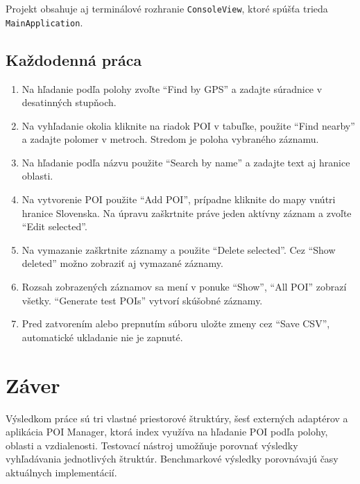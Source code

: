 \documentclass[12pt,a4paper,oneside]{report}
\begin{document}
Projekt obsahuje aj terminálové rozhranie \texttt{Console\allowbreak View},
ktoré spúšťa trieda \texttt{Main\allowbreak Application}.

\section{Každodenná práca}
\begin{enumerate}[leftmargin=1.5em]
\item Na hľadanie podľa polohy zvoľte \enquote{Find by GPS} a zadajte súradnice v desatinných stupňoch.
\item Na vyhľadanie okolia kliknite na riadok POI v tabuľke, použite \enquote{Find nearby} a zadajte polomer v metroch. Stredom je poloha vybraného záznamu.
\item Na hľadanie podľa názvu použite \enquote{Search by name} a zadajte text aj hranice oblasti.
\item Na vytvorenie POI použite \enquote{Add POI}, prípadne kliknite do mapy vnútri hranice Slovenska. Na úpravu zaškrtnite práve jeden aktívny záznam a zvoľte \enquote{Edit selected}.
\item Na vymazanie zaškrtnite záznamy a použite \enquote{Delete selected}. Cez \enquote{Show deleted} možno zobraziť aj vymazané záznamy.
\item Rozsah zobrazených záznamov sa mení v ponuke \enquote{Show}, \enquote{All POI} zobrazí všetky. \enquote{Generate test POIs} vytvorí skúšobné záznamy.
\item Pred zatvorením alebo prepnutím súboru uložte zmeny cez \enquote{Save CSV}, automatické ukladanie nie je zapnuté.
\end{enumerate}

\chapter{Záver}

Výsledkom práce sú tri vlastné priestorové štruktúry, šesť externých
adaptérov a aplikácia POI Manager, ktorá index využíva na hľadanie POI
podľa polohy, oblasti a vzdialenosti. Testovací nástroj umožňuje
porovnať výsledky vyhľadávania jednotlivých štruktúr. Benchmarkové
výsledky porovnávajú časy aktuálnych implementácií.
\end{document}
